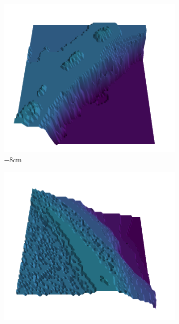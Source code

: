 \documentclass[../document.tex]{subfiles}
\begin{document}
    \begin{figure}[H]
        \centering
        \begin{subfigure}[b]{0.19\textwidth}
        \includegraphics[width=\linewidth]{../img/5/quarry/all/worst/-8-patch-3d-majavi-colormap-0.png}
        \caption{$-8$cm}
        \end{subfigure}
        \begin{subfigure}[b]{0.19\textwidth}
        \includegraphics[width=\linewidth]{../img/5/quarry/all/worst/00-patch-3d-majavi-colormap-1.png}

\end{subfigure}
\end{figure}
\end{document}

